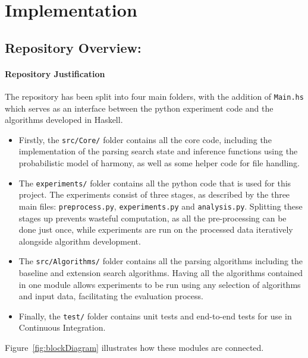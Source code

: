 \documentclass[12pt,a4paper,twoside,openright]{report}
\theoremstyle{definition}
\begin{document}

\chapter{Implementation}

\section{Repository Overview:}

\subsubsection{Repository Justification}

The repository has been split into four main folders, with the addition of \texttt{Main.hs} which serves as an interface between the python experiment code and the algorithms developed in Haskell. 
\begin{itemize}
  \item Firstly, the \texttt{src/Core/} folder contains all the core code, including the implementation of the parsing search state and inference functions using the probabilistic model of harmony, as well as some helper code for file handling. 
  \item The \texttt{experiments/} folder contains all the python code that is used for this project. The experiments consist of three stages, as described by the three main files: \texttt{preprocess.py}, \texttt{experiments.py} and \texttt{analysis.py}. Splitting these stages up prevents wasteful computation, as all the pre-processing can be done just once, while experiments are run on the processed data iteratively alongside algorithm development. 
  \item The \texttt{src/Algorithms/} folder contains all the parsing algorithms including the baseline and extension search algorithms. Having all the algorithms contained in one module allows experiments to be run using any selection of algorithms and input data, facilitating the evaluation process.  
  \item Finally, the \texttt{test/} folder contains unit tests and end-to-end tests for use in Continuous Integration.
\end{itemize}

Figure~\ref{fig:blockDiagram} illustrates how these modules are connected. 
\end{document}
